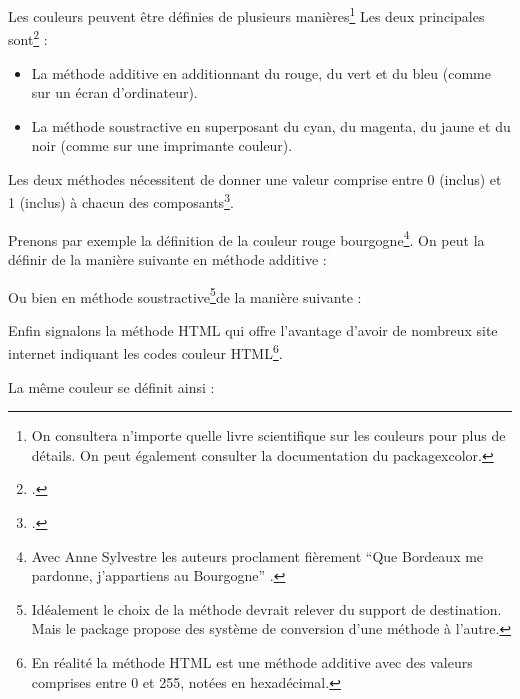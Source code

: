 Les couleurs peuvent être définies de plusieurs manières\footnote{On consultera n'importe quelle livre scientifique sur les couleurs pour plus de détails. On peut également consulter la documentation du package{xcolor}.} Les deux principales sont\footcite[Il existe aussi la méthode de définition par la longueur d'onde pour les couleurs de l'arc en ciel, par pourcentage de gris pour les différents niveaux de gris, ainsi que par teinte, saturation et luminosité, mais ceci nécessiterait un cours de physique lumineuse. Pour  les personnes intéressées par les détails, consulter][]{xcolor_methode} :
\begin{itemize}
\item La méthode additive en additionnant du rouge, du vert et du bleu (comme sur un écran d'ordinateur).
\item La méthode soustractive en superposant du cyan, du magenta, du jaune et du noir (comme sur une imprimante couleur).
\end{itemize}


Les deux méthodes nécessitent de donner une valeur comprise entre 0 (inclus) et 1 (inclus) à chacun des composants\footcite[On pourra trouver une série de code couleur sur le site][]{codecouleur}.



Prenons par exemple la définition de la couleur \textcolor{rougebourgogne}{rouge bourgogne}\footnote{Avec Anne Sylvestre les auteurs proclament fièrement \enquote{Que Bordeaux me pardonne, j’appartiens au Bourgogne} \parencite{romaneconti}.}.
On peut la définir de la manière suivante en méthode additive :
\begin{latexcode}
\end{latexcode}

Ou bien en méthode soustractive\footnote{Idéalement le choix de  la méthode devrait relever du support de destination. Mais le package  propose des système de conversion d'une méthode à l'autre.}de la manière suivante :
\begin{latexcode}
\end{latexcode}

Enfin signalons la méthode HTML qui offre l'avantage d'avoir de nombreux site internet indiquant les codes couleur HTML\footnote{En réalité la méthode HTML est une méthode additive avec des valeurs comprises entre 0 et 255, notées en hexadécimal.}.

La même couleur se définit ainsi :

\begin{latexcode}
\end{latexcode}




